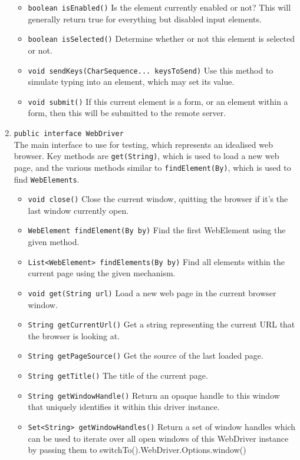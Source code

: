 \documentclass{article}
\begin{document}
\begin{enumerate}
\begin{itemize}
            \item \lstinline{boolean isEnabled()} Is the element currently enabled or not? This will generally return true for everything but disabled input elements.
            \item \lstinline{boolean isSelected()} Determine whether or not this element is selected or not.
            \item \lstinline{void sendKeys(CharSequence... keysToSend)} Use this method to simulate typing into an element, which may set its value.
            \item \lstinline{void submit()} If this current element is a form, or an element within a form, then this will be submitted to the remote server.
        \end{itemize}
    \item \lstinline{public interface WebDriver}\\The main interface to use for testing, which represents an idealised web browser. Key methods are \lstinline{get(String)}, which is used to load a new web page, and the various methods similar to \lstinline{findElement(By)}, which is used to find \lstinline{WebElements}.
        \begin{itemize}
            \item \lstinline{void close()} Close the current window, quitting the browser if it's the last window currently open.
            \item \lstinline{WebElement findElement(By by)} Find the first WebElement using the given method.
            \item \lstinline{List<WebElement> findElements(By by)} Find all elements within the current page using the given mechanism.
            \item \lstinline{void get(String url)} Load a new web page in the current browser window.
            \item \lstinline{String getCurrentUrl()} Get a string representing the current URL that the browser is looking at.
            \item \lstinline{String getPageSource()} Get the source of the last loaded page.
            \item \lstinline{String getTitle()} The title of the current page.
            \item \lstinline{String getWindowHandle()} Return an opaque handle to this window that uniquely identifies it within this driver instance.
            \item \lstinline{Set<String> getWindowHandles()} Return a set of window handles which can be used to iterate over all open windows of this WebDriver instance by passing them to switchTo().WebDriver.Options.window()

\end{itemize}
\end{enumerate}
\end{document}
